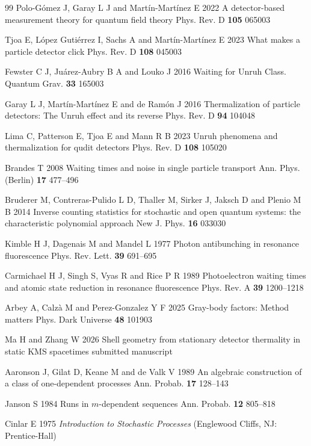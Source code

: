 \begin{thebibliography}{99}
Polo-G\'omez J, Garay L J and Mart\'in-Mart\'inez E 2022 A detector-based measurement theory for quantum field theory Phys. Rev. D \textbf{105} 065003

Tjoa E, L\'opez Guti\'errez I, Sachs A and Mart\'in-Mart\'inez E 2023 What makes a particle detector click Phys. Rev. D \textbf{108} 045003

Fewster C J, Ju\'arez-Aubry B A and Louko J 2016 Waiting for Unruh Class. Quantum Grav. \textbf{33} 165003

Garay L J, Mart\'in-Mart\'inez E and de Ram\'on J 2016 Thermalization of particle detectors: The Unruh effect and its reverse Phys. Rev. D \textbf{94} 104048

Lima C, Patterson E, Tjoa E and Mann R B 2023 Unruh phenomena and thermalization for qudit detectors Phys. Rev. D \textbf{108} 105020

Brandes T 2008 Waiting times and noise in single particle transport Ann. Phys. (Berlin) \textbf{17} 477--496

Bruderer M, Contreras-Pulido L D, Thaller M, Sirker J, Jaksch D and Plenio M B 2014 Inverse counting statistics for stochastic and open quantum systems: the characteristic polynomial approach New J. Phys. \textbf{16} 033030

Kimble H J, Dagenais M and Mandel L 1977 Photon antibunching in resonance fluorescence Phys. Rev. Lett. \textbf{39} 691--695

Carmichael H J, Singh S, Vyas R and Rice P R 1989 Photoelectron waiting times and atomic state reduction in resonance fluorescence Phys. Rev. A \textbf{39} 1200--1218

Arbey A, Calz\`a M and Perez-Gonzalez Y F 2025 Gray-body factors: Method matters Phys. Dark Universe \textbf{48} 101903

Ma H and Zhang W 2026 Shell geometry from stationary detector thermality in static KMS spacetimes submitted manuscript

Aaronson J, Gilat D, Keane M and de Valk V 1989 An algebraic construction of a class of one-dependent processes Ann. Probab. \textbf{17} 128--143

Janson S 1984 Runs in $m$-dependent sequences Ann. Probab. \textbf{12} 805--818

Cinlar E 1975 \emph{Introduction to Stochastic Processes} (Englewood Cliffs, NJ: Prentice-Hall)

\end{thebibliography}
